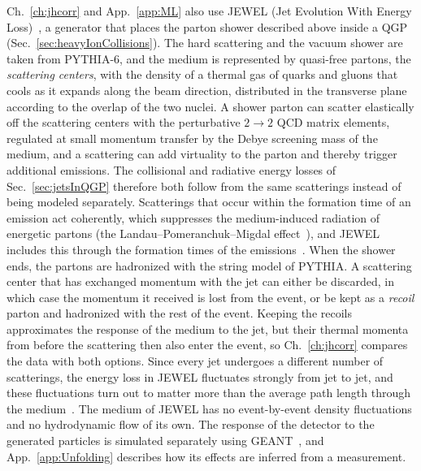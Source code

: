 Ch.~\ref{ch:jhcorr} and App.~\ref{app:ML} also use JEWEL (Jet Evolution With Energy Loss)~\cite{Zapp_2009,Zapp:2013vla}, a generator that places the parton shower described above inside a QGP (Sec.~\ref{sec:heavyIonCollisions}).
%
The hard scattering and the vacuum shower are taken from PYTHIA\mbox{-}6, and the medium is represented by quasi-free partons, the \emph{scattering centers}, with the density of a thermal gas of quarks and gluons that cools as it expands along the beam direction, distributed in the transverse plane according to the overlap of the two nuclei.
%
A shower parton can scatter elastically off the scattering centers with the perturbative \(2 \to 2\) QCD matrix elements, regulated at small momentum transfer by the Debye screening mass of the medium, and a scattering can add virtuality to the parton and thereby trigger additional emissions.
%
The collisional and radiative energy losses of Sec.~\ref{sec:jetsInQGP} therefore both follow from the same scatterings instead of being modeled separately.
%
Scatterings that occur within the formation time of an emission act coherently, which suppresses the medium-induced radiation of energetic partons (the Landau--Pomeranchuk--Migdal effect~\cite{Landau:1953um,Landau:1953gr,Migdal:1956tc}), and JEWEL includes this through the formation times of the emissions~\cite{Zapp:2008af}.
%
When the shower ends, the partons are hadronized with the string model of PYTHIA.
%
A scattering center that has exchanged momentum with the jet can either be discarded, in which case the momentum it received is lost from the event, or be kept as a \emph{recoil} parton and hadronized with the rest of the event.
%
Keeping the recoils approximates the response of the medium to the jet, but their thermal momenta from before the scattering then also enter the event, so Ch.~\ref{ch:jhcorr} compares the data with both options.
%
Since every jet undergoes a different number of scatterings, the energy loss in JEWEL fluctuates strongly from jet to jet, and these fluctuations turn out to matter more than the average path length through the medium~\cite{Zapp:2013zya,Milhano:2015mng}.
%
The medium of JEWEL has no event-by-event density fluctuations and no hydrodynamic flow of its own.
%
The response of the detector to the generated particles is simulated separately using GEANT~\cite{Brun:1987ma}, and App.~\ref{app:Unfolding} describes how its effects are inferred from a measurement.


